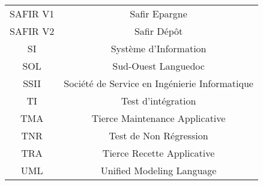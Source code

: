 {\begin{center}
\begin{tabular}{|c|c|}
SAFIR V1 & Safir Epargne\\
SAFIR V2 & Safir Dépôt\\
SI	& Système d’Information\\
SOL	& Sud-Ouest Languedoc\\
SSII	& Société de Service en Ingénierie Informatique\\
TI	& Test d’intégration\\
TMA	& Tierce Maintenance Applicative\\
TNR	& Test de Non Régression\\
TRA	& Tierce Recette Applicative\\
UML	& Unified Modeling Language\\
\hline

\end{tabular}
\end{center}
}
